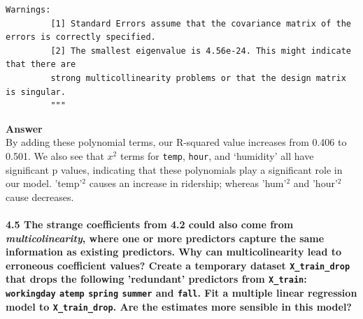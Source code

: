 \documentclass[11pt]{article}
\begin{document}
\begin{Verbatim}[commandchars=\\\{\}]
         Warnings:
         [1] Standard Errors assume that the covariance matrix of the errors is correctly specified.
         [2] The smallest eigenvalue is 4.56e-24. This might indicate that there are
         strong multicollinearity problems or that the design matrix is singular.
         """
\end{Verbatim}
            
    \textbf{Answer}\\
By adding these polynomial terms, our R-squared value increases from
0.406 to 0.501. We also see that \(x^2\) terms for \texttt{temp},
\texttt{hour}, and `humidity' all have significant p values, indicating
that these polynomials play a significant role in our model.
'temp'\(^2\) causes an increase in ridership; whereas 'hum'\(^2\) and
'hour'\(^2\) cause decreases.

    \paragraph{\texorpdfstring{\textbf{4.5} The strange coefficients from
4.2 could also come from \emph{multicolinearity}, where one or more
predictors capture the same information as existing predictors. Why can
multicolinearity lead to erroneous coefficient values? Create a
temporary dataset \texttt{X\_train\_drop} that drops the following
'redundant' predictors from \texttt{X\_train}: \texttt{workingday}
\texttt{atemp} \texttt{spring} \texttt{summer} and \texttt{fall}. Fit a
multiple linear regression model to \texttt{X\_train\_drop}. Are the
estimates more sensible in this
model?}{4.5 The strange coefficients from 4.2 could also come from multicolinearity, where one or more predictors capture the same information as existing predictors. Why can multicolinearity lead to erroneous coefficient values? Create a temporary dataset X\_train\_drop that drops the following 'redundant' predictors from X\_train: workingday atemp spring summer and fall. Fit a multiple linear regression model to X\_train\_drop. Are the estimates more sensible in this model?}}\label{the-strange-coefficients-from-4.2-could-also-come-from-multicolinearity-where-one-or-more-predictors-capture-the-same-information-as-existing-predictors.-why-can-multicolinearity-lead-to-erroneous-coefficient-values-create-a-temporary-dataset-x_train_drop-that-drops-the-following-redundant-predictors-from-x_train-workingday-atemp-spring-summer-and-fall.-fit-a-multiple-linear-regression-model-to-x_train_drop.-are-the-estimates-more-sensible-in-this-model}
\end{document}
